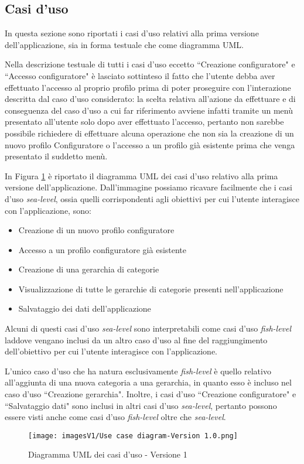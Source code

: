 \subsection{Casi d'uso}
In questa sezione sono riportati i casi d'uso relativi alla prima versione dell'applicazione, sia in forma testuale che come diagramma UML.\bigskip 

Nella descrizione testuale di tutti i casi d'uso eccetto ``Creazione configuratore" e ``Accesso configuratore" è lasciato sottinteso il fatto che l'utente debba aver effettuato l'accesso al proprio profilo prima di poter proseguire con l'interazione descritta dal caso d'uso considerato: la scelta relativa all'azione da effettuare e di conseguenza del caso d'uso a cui far riferimento avviene infatti tramite un menù presentato all'utente solo dopo aver effettuato l'accesso, pertanto non sarebbe possibile richiedere di effettuare alcuna operazione che non sia la creazione di un nuovo profilo Configuratore o l'accesso a un profilo già esistente prima che venga presentato il suddetto menù.\bigskip



In Figura \ref{fig:Use Case 1} è riportato il diagramma UML dei casi d'uso relativo alla prima versione dell'applicazione. Dall'immagine possiamo ricavare facilmente che i casi d'uso \textit{sea-level}, ossia quelli corrispondenti agli obiettivi per cui l'utente interagisce con l'applicazione, sono:
\begin{itemize}
    \item Creazione di un nuovo profilo configuratore 
    \item Accesso a un profilo configuratore già esistente
    \item Creazione di una gerarchia di categorie
    \item Visualizzazione di tutte le gerarchie di categorie presenti nell'applicazione
    \item Salvataggio dei dati dell'applicazione
\end{itemize}
Alcuni di questi casi d'uso \textit{sea-level} sono interpretabili come casi d'uso \textit{fish-level} laddove vengano inclusi da un altro caso d'uso al fine del raggiungimento dell'obiettivo per cui l'utente interagisce con l'applicazione.

L'unico caso d'uso che ha natura esclusivamente \textit{fish-level} è quello relativo all'aggiunta di una nuova categoria a una gerarchia, in quanto esso è incluso nel caso d'uso ``Creazione gerarchia". Inoltre, i casi d'uso ``Creazione configuratore" e ``Salvataggio dati" sono inclusi in altri casi d'uso \textit{sea-level}, pertanto possono essere visti anche come casi d'uso \textit{fish-level} oltre che \textit{sea-level}.

\begin{figure}[hb]
\centering
\texttt{[image: imagesV1/Use case diagram-Version 1.0.png]}
\caption{\label{fig:Use Case 1}Diagramma UML dei casi d'uso - Versione 1}
\end{figure}\bigskip